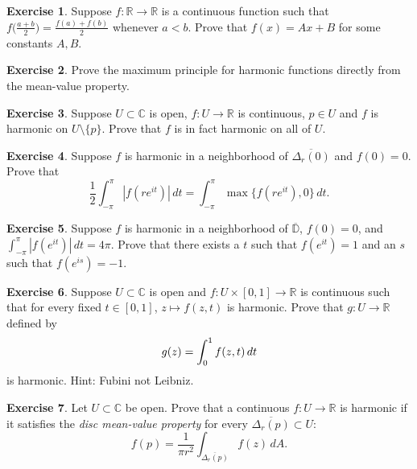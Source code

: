 \documentclass[12pt,openany]{book}
\newcommand{\avoidbreak}{\postdisplaypenalty=100}
\newcommand{\abs}[1]{\left\lvert {#1} \right\rvert}
\newcommand{\C}{{\mathbb{C}}}
\newcommand{\R}{{\mathbb{R}}}
\newcommand{\D}{{\mathbb{D}}}
\newcommand{\myindex}[1]{#1\index{#1}}
\theoremstyle{plain}
\theoremstyle{remark}
\theoremstyle{definition}
\newenvironment{exbox}{%
    \def\FrameCommand{\vrule width 1pt \relax\hspace{10pt}}%
    \MakeFramed{\advance\hsize-\width\FrameRestore}%
}{%
    \endMakeFramed
}
\theoremstyle{exercise}
\newtheorem{exercise}{Exercise}[section]
\theoremstyle{example}
\begin{document}
\begin{exbox}
\begin{exercise}
Suppose $f \colon \R \to \R$ is a continuous function such that
$f\bigl(\frac{a+b}{2}\bigr) = \frac{f(a)+f(b)}{2}$ whenever $a < b$.
Prove that $f(x) = Ax + B$ for some constants $A,B$.
\end{exercise}

\begin{exercise}
Prove the maximum principle for harmonic functions directly from the
mean-value property.
\end{exercise}

\begin{exercise}
Suppose $U \subset \C$ is open, $f \colon U \to \R$ is continuous, $p \in U$
and $f$ is harmonic on $U \setminus \{ p \}$.  Prove that $f$ is in fact
harmonic on all of $U$.
\end{exercise}

\begin{exercise}
Suppose $f$ is harmonic in a neighborhood of
$\overline{\Delta_r(0)}$ and
$f(0) = 0$.  Prove that
\begin{equation*}
\frac{1}{2} \int_{-\pi}^\pi \abs{f(re^{it})} \, dt = 
\int_{-\pi}^\pi \max \{ f(re^{it}), 0 \} \, dt .
\end{equation*}
\end{exercise}

\begin{exercise}
Suppose $f$ is harmonic in a neighborhood of
$\overline{\D}$, $f(0) = 0$, and $\int_{-\pi}^\pi \abs{f(e^{it})}\, dt =
4\pi$.
Prove that there exists a $t$ such that $f(e^{it}) = 1$ and an $s$ such that
$f(e^{is}) = -1$.
\end{exercise}

\begin{exercise}
Suppose $U \subset \C$ is open and
$f \colon U \times [0,1] \to \R$ is continuous
such that for every fixed $t \in [0,1]$, $z \mapsto f(z,t)$ is harmonic.
Prove that $g \colon U \to \R$ defined by
\begin{equation*}
g(z) = \int_0^1 f(z,t) \, dt
\avoidbreak
\end{equation*}
is harmonic.  Hint: Fubini not Leibniz.
\end{exercise}

\begin{exercise}
Let $U \subset \C$ be open.
Prove that a continuous $f \colon U \to \R$
is harmonic if it satisfies the
\emph{\myindex{disc mean-value property}} for every $\overline{\Delta_r(p)}
\subset U$:
\begin{equation*}
f(p) = 
\frac{1}{\pi r^2} \int_{\overline{\Delta_r(p)}} f(z) \, dA.
\end{equation*}
\end{exercise}


\end{exbox}
\end{document}
